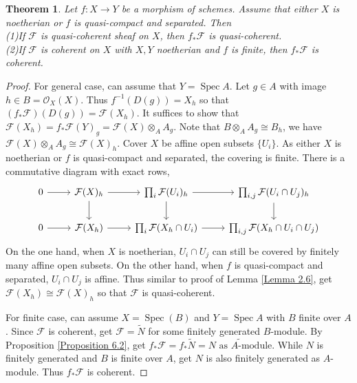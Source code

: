 \documentclass{ctexart}
\newtheorem{theorem}{Theorem}[section]
\newcommand{\spec}{\operatorname{Spec}}
\begin{document}
\begin{theorem}
    Let $f: X \longrightarrow Y$ be a morphism of schemes.
    Assume that either $X$ is noetherian or $f$ is quasi-compact and separated.
    Then \\
    (1)If $\mathcal{F}$ is quasi-coherent sheaf on $X$, then $f_{\ast}\mathcal{F}$ is quasi-coherent. \\
    (2)If $\mathcal{F}$ is coherent on $X$ with $X,Y$ noetherian and $f$ is finite, then $f_{\ast}\mathcal{F}$ is coherent.
    \label{Theorem 6.2} 
\end{theorem}
\begin{proof}
    For general case, can assume that $Y = \spec A$.
    Let $g\in A$ with image $h\in B = \mathcal{O}_{X}(X)$.
    Thus $f^{-1}(D(g)) = X_{h}$ so that $(f_{\ast}\mathcal{F})(D(g)) = \mathcal{F}(X_{h})$.
    It suffices to show that $\mathcal{F}(X_{h}) = f_{\ast}\mathcal{F}(Y)_{g} = \mathcal{F}(X) \otimes_{A} A_{g}$.
    Note that $B \otimes_{A} A_{g} \cong B_{h}$, we have $\mathcal{F}(X) \otimes_{A} A_{g} \cong \mathcal{F}(X)_{h}$.
    Cover $X$ be affine open subsets $\{U_{i}\}$.
    As either $X$ is noetherian or $f$ is quasi-compact and separated, the covering is finite.
    There is a commutative diagram with exact rows,
    \begin{equation*}
        \begin{tikzcd}
            0 \arrow[r] &
            \mathcal{F}(X)_{h} \arrow[r] \arrow[d] &
            \prod_{i} \mathcal{F}(U_{i})_{h} \arrow[r] \arrow[d] &
            \prod_{i,j} \mathcal{F}(U_{i} \cap U_{j})_{h} \arrow[d] \\
            0 \arrow[r] &
            \mathcal{F}(X_{h}) \arrow[r] &
            \prod_{i} \mathcal{F}(X_{h} \cap U_{i}) \arrow[r] &
            \prod_{i,j} \mathcal{F}(X_{h} \cap U_{i} \cap U_{j})
        \end{tikzcd}
    \end{equation*}
    On the one hand, when $X$ is noetherian, $U_{i} \cap U_{j}$ can still be covered by finitely many affine open subsets.
    On the other hand, when $f$ is quasi-compact and separated, $U_{i} \cap U_{j}$ is affine.
    Thus similar to proof of Lemma \ref{Lemma 2.6}, get $\mathcal{F}(X_{h}) \cong \mathcal{F}(X)_{h}$ so that $\mathcal{F}$ is quasi-coherent.
    \par
    For finite case, can assume $X = \spec(B)$ and $Y = \spec A$ with $B$ finite over $A$.
    Since $\mathcal{F}$ is coherent, get $\mathcal{F} = \widetilde{N}$ for some finitely generated $B$-module.
    By Proposition \ref{Proposition 6.2}, get $f_{\ast}\mathcal{F} = f_{\ast}\widetilde{N} = \widetilde{N \text{ as $A$-module}}$.
    While $N$ is finitely generated and $B$ is finite over $A$, get $N$ is also finitely generated as $A$-module.
    Thus $f_{\ast}\mathcal{F}$ is coherent.
\end{proof}
\end{document}
